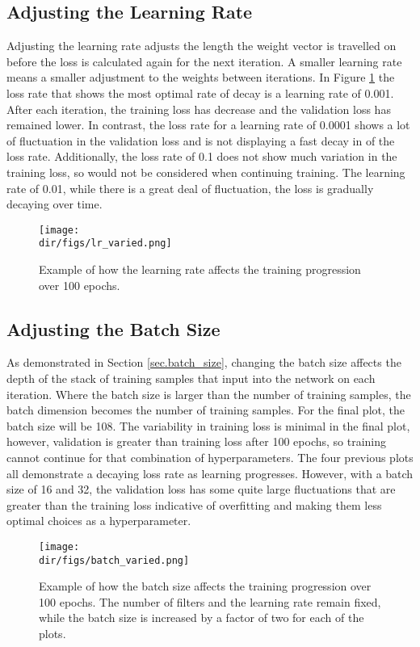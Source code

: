 \subsection{Adjusting the Learning Rate}
Adjusting the learning rate adjusts the length the weight vector is travelled on before the loss is calculated again for the next iteration. A smaller learning rate means a smaller adjustment to the weights between iterations. In Figure \ref{fig.lr_varied} the loss rate that shows the most optimal rate of decay is a learning rate of 0.001. After each iteration, the training loss has decrease and the validation loss has remained lower. In contrast, the loss rate for a learning rate of 0.0001 shows a lot of fluctuation in the validation loss and is not displaying a fast decay in of the loss rate. Additionally, the loss rate of 0.1 does not show much variation in the training loss, so would not be considered when continuing training. The learning rate of 0.01, while there is a great deal of fluctuation, the loss is gradually decaying over time. 
\begin{figure}[htpb]
    \centering
    \texttt{[image: \\dir/figs/lr\_varied.png]}
    \caption[Example of the affect of changing the learning rate]{Example of how the learning rate affects the training progression over 100 epochs.}
    \label{fig.lr_varied}
\end{figure}
\subsection{Adjusting the Batch Size}
As demonstrated in Section \ref{sec.batch_size}, changing the batch size affects the depth of the stack of training samples that input into the network on each iteration. Where the batch size is larger than the number of training samples, the batch dimension becomes the number of training samples. For the final plot, the batch size will be 108. The variability in training loss is minimal in the final plot, however, validation is greater than training loss after 100 epochs, so training cannot continue for that combination of hyperparameters. The four previous plots all demonstrate a decaying loss rate as learning progresses. However, with a batch size of 16 and 32, the validation loss has some quite large fluctuations that are greater than the training loss indicative of overfitting and making them less optimal choices as a hyperparameter. 
\begin{figure}[htpb]
    \centering
    \texttt{[image: \\dir/figs/batch\_varied.png]}
    \caption[Example of the affect of changing the batch size]{Example of how the batch size affects the training progression over 100 epochs. The number of filters and the learning rate remain fixed, while the batch size is increased by a factor of two for each of the plots.}
    \label{fig.batch_varied}
\end{figure}
